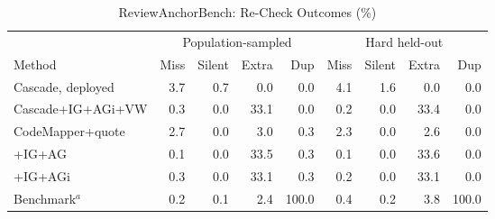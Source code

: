 \begin{table}[t]
\caption{ReviewAnchorBench: Re-Check Outcomes (\%)}\label{tab:rab}
\centering\footnotesize
\setlength{\tabcolsep}{2pt}
\begin{tabular}{@{}lrrrrrrrr@{}}\toprule
 & \multicolumn{4}{c}{Population-sampled} & \multicolumn{4}{c}{Hard held-out} \\
\cmidrule(lr){2-5}\cmidrule(l){6-9}
Method & Miss & Silent & Extra & Dup & Miss & Silent & Extra & Dup \\ \midrule
Cascade, deployed & 3.7 & 0.7 & 0.0 & 0.0 & 4.1 & 1.6 & 0.0 & 0.0 \\
Cascade+IG+AGi+VW & 0.3 & 0.0 & 33.1 & 0.0 & 0.2 & 0.0 & 33.4 & 0.0 \\
CodeMapper+quote & 2.7 & 0.0 & 3.0 & 0.3 & 2.3 & 0.0 & 2.6 & 0.0 \\
\quad +IG+AG & 0.1 & 0.0 & 33.5 & 0.3 & 0.1 & 0.0 & 33.6 & 0.0 \\
\quad +IG+AGi & 0.3 & 0.0 & 33.1 & 0.3 & 0.2 & 0.0 & 33.1 & 0.0 \\
Benchmark$^{a}$ & 0.2 & 0.1 & 2.4 & 100.0 & 0.4 & 0.2 & 3.8 & 100.0 \\
\bottomrule
\end{tabular}
\end{table}
